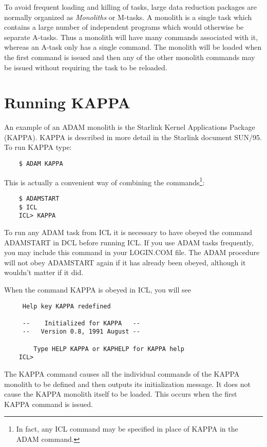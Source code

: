 To avoid frequent loading and killing of tasks, large data reduction packages
are normally organized as {\em Monoliths} or M-tasks. A monolith is a single
task which contains a large number of independent programs which would
otherwise be separate A-tasks. Thus a monolith will have many commands
associated with it, whereas an A-task only has a single command. The
monolith will be loaded when the first command is issued and then any
of the other monolith commands may be issued without requiring the task
to be reloaded.

\section{Running KAPPA}

An example of an ADAM monolith is the Starlink Kernel Applications Package
(KAPPA). KAPPA is described in more detail in the Starlink document SUN/95.
To run KAPPA type:

\begin{verbatim}
    $ ADAM KAPPA
\end{verbatim}

This is actually a convenient way of combining the commands\footnote{
In fact, any ICL command may be specified in place of KAPPA in the ADAM
command.}:

\begin{verbatim}
    $ ADAMSTART
    $ ICL
    ICL> KAPPA
\end{verbatim}

To run any ADAM task from ICL it is necessary to have obeyed the command 
ADAMSTART in DCL before running ICL.
If you use ADAM tasks frequently, you may include this command in your 
LOGIN.COM file. The ADAM procedure will not obey ADAMSTART again if it has
already been obeyed, although it wouldn't matter if it did.

When the command KAPPA is obeyed in ICL, you will see         

\begin{verbatim}
     Help key KAPPA redefined
     
     --    Initialized for KAPPA   --
     --   Version 0.8, 1991 August --

        Type HELP KAPPA or KAPHELP for KAPPA help
    ICL>
\end{verbatim}

The KAPPA command causes all the individual commands of the KAPPA monolith
to be defined and then outputs its initialization message. It does not cause
the KAPPA monolith itself to be loaded. This occurs when the first KAPPA
command is issued. 

